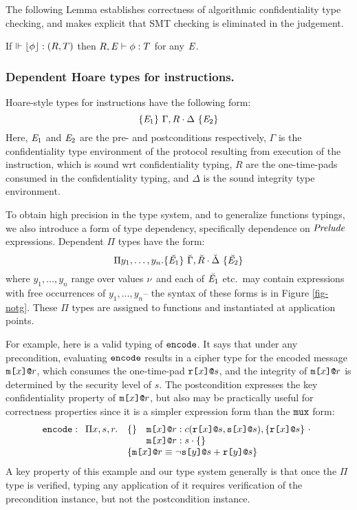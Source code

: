 The following Lemma establishes correctness of algorithmic confidentiality
type checking, and makes explicit that SMT checking is eliminated in the
judgement.
\begin{lemma}
  \label{lemma-atj-sound}
  If $\Vdash \lfloor \phi \rfloor : (R,T)$ then $R,\mathit{E} \vdash \phi : T$ for any $\mathit{E}$.
\end{lemma}

\subsubsection{Dependent Hoare types for instructions.}

Hoare-style types for instructions have the following form:
$$
\{ \mathit{E}_1 \}\ \Gamma,R \cdot \Delta\ \{ \mathit{E}_2 \}
$$
Here, $\mathit{E}_1$ and $\mathit{E}_2$ are the pre- and postconditions
respectively, $\Gamma$ is the confidentiality type environment of the
protocol resulting from execution of the instruction, which is sound
wrt confidentiality typing, $R$ are the one-time-pads consumed in the
confidentiality typing, and $\Delta$ is the sound integrity type
environment.

\notgfig

To obtain high precision in the type system, and to generalize
functions typings, we also introduce a form of type dependency,
specifically dependence on $\mathit{Prelude}$ expressions. Dependent
$\Pi$ types have the form:
$$
\Pi y_1,\ldots,y_n . \{ \breve{\mathit{E}_1} \}\ \breve{\Gamma},\breve{R} \cdot \breve{\Delta}\ \{ \breve{\mathit{E}_2} \}
$$
where $y_1,\ldots,y_n$ range over values $\nu$ and each of
$\breve{\mathit{E}_1}$ etc.~may contain expressions with free occurrences
of $y_1,\ldots,y_n$-- the syntax of these forms is in Figure
\ref{fig-notg}. These $\Pi$ types are assigned to functions
and instantiated at application points. 

For example, here is a valid typing of $\texttt{encode}$.  It says that
under any precondition, evaluating $\texttt{encode}$ results in a cipher
type for the encoded message $\texttt{m[}x\texttt{]}\texttt{@}r$, which consumes the
one-time-pad $\texttt{r[}x\texttt{]}\texttt{@}s$, and the integrity of $\texttt{m[}x\texttt{]}\texttt{@}r$ is
determined by the security level of $s$. The
postcondition expresses the key confidentiality property of
$\texttt{m[}x\texttt{]}\texttt{@}r$, but also may be practically useful for correctness
properties since it is a simpler expression form than the $\texttt{mux}$
form:
$$
\ttt{encode} :
\begin{array}[t]{ll}
  \Pi x,s,r . & \{ \}\quad \mx{x}{r} : \cty{\rx{x}{s}}{\sx{x}{s}}, \{ \rx{x}{s} \} \ \cdot\\
  & \phantom{\{ \}} \quad \mx{x}{r} : \ity{s}{\setit{}} \\
  & \{ \mx{x}{r} \eop \neg\sx{y}{s} \fplus \rx{y}{s} \}
\end{array}
$$
A key property of this example and our type system generally is that once
the $\Pi$ type is verified, typing any application of it requires verification
of the precondition instance, but not the postcondition instance.

